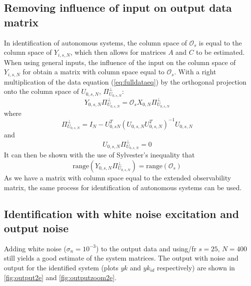 \documentclass[11pt,a4paper]{article}
\begin{document}
\subsection{Removing influence of input on output data matrix}
In identification of autonomous systems, the column space of $\mathcal{O}_s$ is
equal to the column space of $Y_{i, s, N}$, which then allows for matrices $A$
and $C$ to be estimated. When using general inputs, the influence of the input
on the column space of $Y_{i, s, N}$ for obtain a matrix with column space
equal to $\mathcal{O}_s$. With a right multiplication of the data equation
(\autoref{eq:fulldataeq}) by the orthogonal projection onto the column space of
$U_{0, s, N}$, $\Pi^\perp_{U_{0,s,N}}$:
\begin{equation}
    \label{eq:yuperp}
    Y_{0, s, N} \Pi^\perp_{U_{0,s,N}} =
        \mathcal{O}_s X_{0, N} \Pi^\perp_{U_{0,s,N}} 
\end{equation}
where 
\begin{equation}
    \label{eq:uoperp}
    \Pi^\perp_{U_{0,s,N}} =
        I_N - U^T_{0,s N}(U_{0, s, N}U^T_{0,s,N})^{-1} U_{0,s,N}
\end{equation}
and
\begin{equation*}
    U_{0,s,N} \Pi^\perp_{U_{0,s,N}} = 0
\end{equation*}
It can then be shown with the use of Sylvester's inequality that
\begin{equation*}
    \text{range}(Y_{0,s,N} \Pi^\perp_{U_{0,s,N}}) =
        \text{range}(\mathcal{O}_s)
\end{equation*}
As we have a matrix with column space equal to the extended observability
matrix, the same process for identification of autonomous systems can be used.

\subsection{Identification with white noise excitation and output noise}
Adding white noise ($\sigma_n = 10^{-3}$) to the output data and using/fr
\mbox{$s = 25$}, \mbox{$N = 400$} still yields a good estimate of the system
matrices. The output with noise and output for the identified system (plots
$yk$ and $yk_{id}$ respectively) are shown in \autoref{fig:output2e} and
\autoref{fig:outputzoom2e}.

\end{document}
